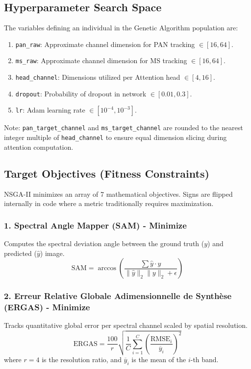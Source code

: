 \documentclass[11pt]{article}
\begin{document}
\subsection{Hyperparameter Search Space}
The variables defining an individual in the Genetic Algorithm population are:
\begin{enumerate}
    \item \texttt{pan\_raw}: Approximate channel dimension for PAN tracking $\in [16, 64]$.
    \item \texttt{ms\_raw}: Approximate channel dimension for MS tracking $\in [16, 64]$.
    \item \texttt{head\_channel}: Dimensions utilized per Attention head $\in [4, 16]$.
    \item \texttt{dropout}: Probability of dropout in network $\in [0.01, 0.3]$.
    \item \texttt{lr}: Adam learning rate $\in [10^{-4}, 10^{-3}]$.
\end{enumerate}
Note: \texttt{pan\_target\_channel} and \texttt{ms\_target\_channel} are rounded to the nearest integer multiple of \texttt{head\_channel} to ensure equal dimension slicing during attention computation.

\subsection{Target Objectives (Fitness Constraints)}
NSGA-II minimizes an array of 7 mathematical objectives. Signs are flipped internally in code where a metric traditionally requires maximization.

\subsubsection{1. Spectral Angle Mapper (SAM) - Minimize}
Computes the spectral deviation angle between the ground truth ($y$) and predicted ($\hat{y}$) image.
\[ \text{SAM} = \arccos\left( \frac{\sum \hat{y} \cdot y}{\|\hat{y}\|_2 \|y\|_2 + \epsilon} \right) \]

\subsubsection{2. Erreur Relative Globale Adimensionnelle de Synth\`ese (ERGAS) - Minimize}
Tracks quantitative global error per spectral channel scaled by spatial resolution.
\[ \text{ERGAS} = \frac{100}{r} \sqrt{ \frac{1}{C} \sum_{i=1}^C \left( \frac{\text{RMSE}_i}{\overline{y}_i} \right)^2 } \]
where $r = 4$ is the resolution ratio, and $\overline{y}_i$ is the mean of the $i$-th band.
\end{document}
